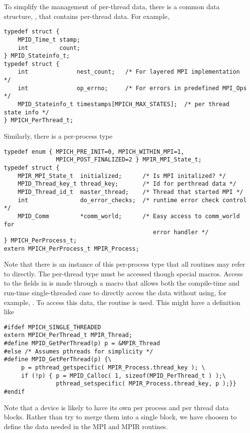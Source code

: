 \documentclass{article}
\begin{document}
To simplify the management of per-thread data, there is a common data
structure, , that contains per-thread data.
For example,
% 
\begin{verbatim}
typedef struct {
    MPID_Time_t stamp;
    int         count;
} MPID_Stateinfo_t;
typedef struct {
    int              nest_count;   /* For layered MPI implementation */
    int              op_errno;     /* For errors in predefined MPI_Ops */
    MPID_Stateinfo_t timestamps[MPICH_MAX_STATES];  /* per thread state info */
} MPICH_PerThread_t;
\end{verbatim}
Similarly, there is a per-process type
\begin{verbatim}
typedef enum { MPICH_PRE_INIT=0, MPICH_WITHIN_MPI=1,
               MPICH_POST_FINALIZED=2 } MPIR_MPI_State_t;
typedef struct {
    MPIR_MPI_State_t  initialized;      /* Is MPI initalized? */
    MPID_Thread_key_t thread_key;       /* Id for perthread data */
    MPID_Thread_id_t  master_thread;    /* Thread that started MPI */
    int               do_error_checks;  /* runtime error check control */
    MPID_Comm         *comm_world;      /* Easy access to comm_world for
                                           error handler */
} MPICH_PerProcess_t;
extern MPICH_PerProcess_t MPIR_Process;
\end{verbatim}
Note that there is an instance of this per-process type that all routines may
refer to directly.  The per-thread type must be accessed though special
macros. 
Access to the fields in  is made through a macro that
allows both the compile-time and run-time single-threaded case to directly
access the data without using, for example, .
To access this data, the routine  is used.  This
might have a definition like
\begin{verbatim}
#ifdef MPICH_SINGLE_THREADED
extern MPICH_PerThread_t MPIR_Thread;
#define MPID_GetPerThread(p) p = &MPIR_Thread
#else /* Assumes pthreads for simplicity */
#define MPID_GetPerThread(p) {\
     p = pthread_getspecific( MPIR_Process.thread_key ); \
     if (!p) { p = MPID_Calloc( 1, sizeof(MPID_PerThread_t ) );\
               pthread_setspecific( MPIR_Process.thread_key, p );}}
#endif
\end{verbatim}

Note that a device is likely to have its own per process and per
thread data blocks.  Rather than try to merge them into a single
block, we have choosen to define the data needed in the MPI and MPIR
routines.
\end{document}
